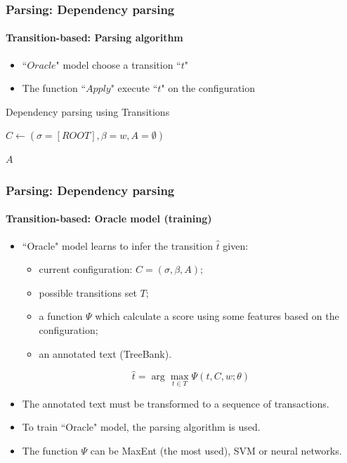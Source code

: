 \documentclass[xcolor=table]{beamer}
\begin{document}
\begin{frame}
\frametitle{Parsing: Dependency parsing}
\framesubtitle{Transition-based: Parsing algorithm}

\begin{itemize}
	\item ``$Oracle$" model choose a transition ``$t$"
	\item The function ``$Apply$" execute ``$t$" on the configuration
\end{itemize}

\begin{block}{Dependency parsing using Transitions}
	\begin{algorithm}[H]
		
		$C \leftarrow (\sigma=[ROOT], \beta = w, A = \emptyset)$\;
		
		
	
		\Return $A$ \;
	\end{algorithm}
\end{block}

\end{frame}

\begin{frame}
\frametitle{Parsing: Dependency parsing}
\framesubtitle{Transition-based: Oracle model (training)}

\begin{itemize}
	\item ``Oracle" model learns to infer the transition $\hat{t}$ given:
	\begin{itemize}
		\item current configuration: $ C = (\sigma, \beta, A) $;
		\item possible transitions set $T$;
		\item a function $\Psi$ which calculate a score using some features based on the configuration;
		\item an annotated text (TreeBank).
	\end{itemize}
	\[ \hat{t} = \arg\max\limits_{t \in T} \Psi (t, C, w; \theta) \]

	\item The annotated text must be transformed to a sequence of transactions.
	\item To train ``Oracle" model, the parsing algorithm is used.
	\item The function $\Psi$  can be MaxEnt (the most used), SVM or neural networks.
\end{itemize}

\end{frame}
\end{document}
